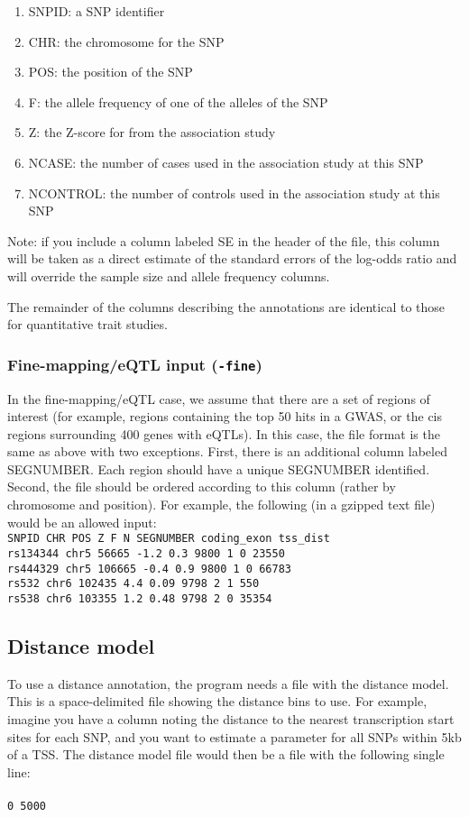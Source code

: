 \documentclass[11pt,titlepage]{article}
\begin{document}
\begin{enumerate}
\item SNPID: a SNP identifier
\item CHR: the chromosome for the SNP
\item POS: the position of the SNP
\item F: the allele frequency of one of the alleles of the SNP
\item Z: the Z-score for from the association study
\item NCASE: the number of cases used in the association study at this SNP
\item NCONTROL: the number of controls used in the association study at this SNP
\end{enumerate}

Note: if you include a column labeled SE in the header of the file, this column will be taken as a direct estimate of the standard errors of the log-odds ratio and will override the sample size and allele frequency columns. 

The remainder of the columns describing the annotations are identical to those for quantitative trait studies. 

\subsubsection{Fine-mapping/eQTL input (\texttt{-fine})} \label{finemap}
In the fine-mapping/eQTL case, we assume that there are a set of regions of interest (for example, regions containing the top 50 hits in a GWAS, or the cis regions surrounding 400 genes with eQTLs). In this case, the file format is the same as above with two exceptions. First, there is an additional column labeled SEGNUMBER. Each region should have a unique SEGNUMBER identified. Second, the file should be ordered according to this column (rather by chromosome and position). For example, the following (in a gzipped text file) would be an allowed input:
\\

\noindent \texttt{SNPID CHR POS Z F N SEGNUMBER coding\_exon tss\_dist}\\
\texttt{rs134344 chr5 56665 -1.2 0.3 9800 1 0 23550}\\
\texttt{rs444329 chr5 106665 -0.4 0.9 9800  1 0 66783}\\
\texttt{rs532 chr6 102435 4.4 0.09 9798 2 1 550}\\
\texttt{rs538 chr6 103355 1.2 0.48 9798 2 0 35354}

\subsection{Distance model} \label{dist_input}
To use a distance annotation, the program needs a file with the distance model. This is a space-delimited file showing the distance bins to use. For example, imagine you have a column noting the distance to the nearest transcription start sites for each SNP, and you want to estimate a parameter for all SNPs within 5kb of a TSS. The distance model file would then be a file with the following single line:
\\
\\
\noindent \texttt{0 5000} \\
\end{document}
